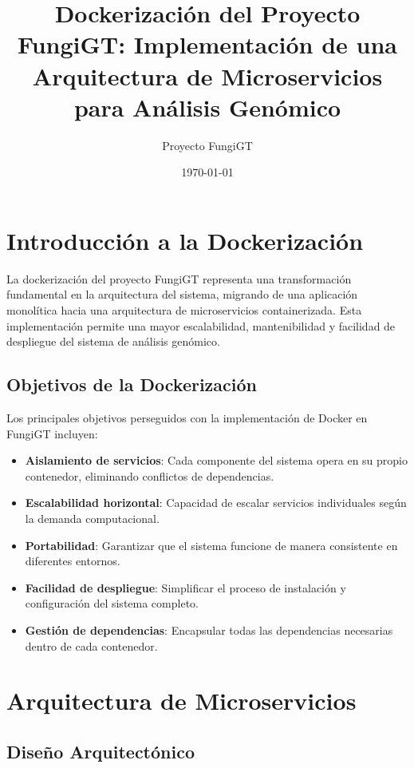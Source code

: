 \documentclass[12pt,a4paper]{article}
\title{Dockerización del Proyecto FungiGT: Implementación de una Arquitectura de Microservicios para Análisis Genómico}
\author{Proyecto FungiGT}
\date{\today}
\begin{document}
\maketitle

\section{Introducción a la Dockerización}

La dockerización del proyecto FungiGT representa una transformación fundamental en la arquitectura del sistema, migrando de una aplicación monolítica hacia una arquitectura de microservicios containerizada. Esta implementación permite una mayor escalabilidad, mantenibilidad y facilidad de despliegue del sistema de análisis genómico.

\subsection{Objetivos de la Dockerización}

Los principales objetivos perseguidos con la implementación de Docker en FungiGT incluyen:

\begin{itemize}
    \item \textbf{Aislamiento de servicios}: Cada componente del sistema opera en su propio contenedor, eliminando conflictos de dependencias.
    \item \textbf{Escalabilidad horizontal}: Capacidad de escalar servicios individuales según la demanda computacional.
    \item \textbf{Portabilidad}: Garantizar que el sistema funcione de manera consistente en diferentes entornos.
    \item \textbf{Facilidad de despliegue}: Simplificar el proceso de instalación y configuración del sistema completo.
    \item \textbf{Gestión de dependencias}: Encapsular todas las dependencias necesarias dentro de cada contenedor.
\end{itemize}

\section{Arquitectura de Microservicios}

\subsection{Diseño Arquitectónico}
\end{document}
